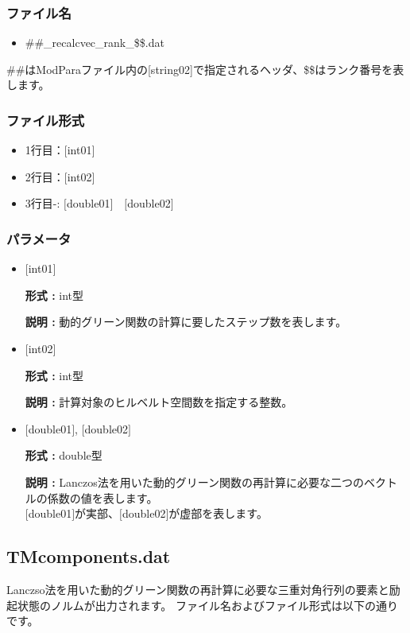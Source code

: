 \subsubsection{ファイル名}
\begin{itemize}
   \item{\#\#\_recalcvec\_rank\_\$\$.dat}
\end{itemize}
  \#\#はModParaファイル内の[string02]で指定されるヘッダ、\$\$はランク番号を表します。

\subsubsection{ファイル形式}
 \begin{itemize}
   \item  1行目：$[$int01$]$
   \item  2行目：$[$int02$]$
   \item  3行目-: $[$double01$]$~~$[$double02$]$
  \end{itemize}
\subsubsection{パラメータ}
 \begin{itemize}

  \item  $[$int01$]$

 {\bf 形式 :} int型

 {\bf 説明 :} 動的グリーン関数の計算に要したステップ数を表します。

  \item  $[$int02$]$

 {\bf 形式 :} int型

{\bf 説明 :} 計算対象のヒルベルト空間数を指定する整数。

 
 \item  $[$double01$]$, $[$double02$]$

 {\bf 形式 :} double型 

{\bf 説明 :} Lanczos法を用いた動的グリーン関数の再計算に必要な二つのベクトルの係数の値を表します。\\
$[$double01$]$が実部、$[$double02$]$が虚部を表します。\\
\end{itemize}

\newpage
\subsection{{TMcomponents.dat}}
Lanczso法を用いた動的グリーン関数の再計算に必要な三重対角行列の要素と励起状態のノルムが出力されます。
ファイル名およびファイル形式は以下の通りです。

